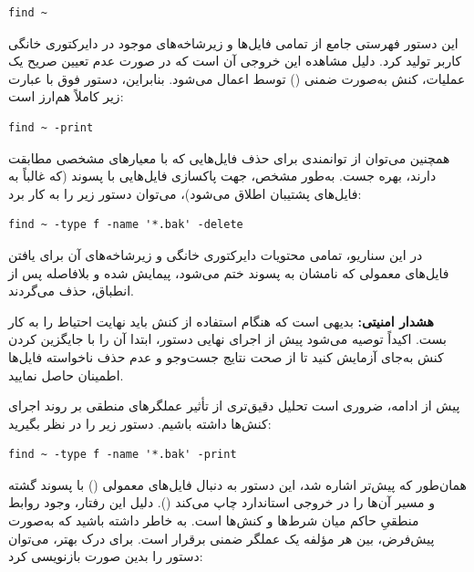 \begin{latin}
\begin{lstlisting}
find ~
\end{lstlisting}
\end{latin}

این دستور فهرستی جامع از تمامی فایل‌ها و زیرشاخه‌های موجود در دایرکتوری خانگی کاربر تولید کرد. دلیل مشاهده این خروجی آن است که در صورت عدم تعیین صریح یک عملیات، کنش  به‌صورت ضمنی () توسط  اعمال می‌شود. بنابراین، دستور فوق با عبارت زیر کاملاً هم‌ارز است:

\begin{latin}
\begin{lstlisting}
find ~ -print
\end{lstlisting}
\end{latin}

همچنین می‌توان از توانمندی  برای حذف فایل‌هایی که با معیارهای مشخصی مطابقت دارند، بهره جست. به‌طور مشخص، جهت پاکسازی فایل‌هایی با پسوند  (که غالباً به فایل‌های پشتیبان اطلاق می‌شود)، می‌توان دستور زیر را به کار برد:

\begin{latin}
\begin{lstlisting}
find ~ -type f -name '*.bak' -delete
\end{lstlisting}
\end{latin}

در این سناریو، تمامی محتویات دایرکتوری خانگی و زیرشاخه‌های آن برای یافتن فایل‌های معمولی که نامشان به پسوند  ختم می‌شود، پیمایش شده و بلافاصله پس از انطباق، حذف می‌گردند.

\begin{warning}
\textbf{هشدار امنیتی:} بدیهی است که هنگام استفاده از کنش  باید نهایت احتیاط را به کار بست. اکیداً توصیه می‌شود پیش از اجرای نهایی دستور، ابتدا آن را با جایگزین کردن کنش  به‌جای  آزمایش کنید تا از صحت نتایج جست‌وجو و عدم حذف ناخواسته فایل‌ها اطمینان حاصل نمایید.
\end{warning}

پیش از ادامه، ضروری است تحلیل دقیق‌تری از تأثیر عملگرهای منطقی بر روند اجرای کنش‌ها داشته باشیم. دستور زیر را در نظر بگیرید:

\begin{latin}
\begin{lstlisting}
find ~ -type f -name '*.bak' -print
\end{lstlisting}
\end{latin}

همان‌طور که پیش‌تر اشاره شد، این دستور به دنبال فایل‌های معمولی () با پسوند  گشته و مسیر آن‌ها را در خروجی استاندارد چاپ می‌کند (). دلیل این رفتار، وجود روابط منطقیِ حاکم میان شرط‌ها و کنش‌ها است. به خاطر داشته باشید که به‌صورت پیش‌فرض، بین هر مؤلفه یک عملگر  ضمنی برقرار است. برای درک بهتر، می‌توان دستور را بدین صورت بازنویسی کرد:


